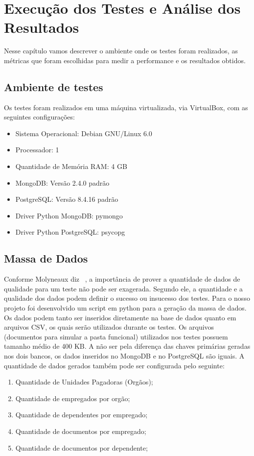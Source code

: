 \chapter {Execução dos Testes e Análise dos Resultados}

Nesse capítulo vamos descrever o ambiente onde os testes foram realizados, as métricas que foram escolhidas para medir a performance e os resultados obtidos.

\section{Ambiente de testes}

Os testes foram realizados em uma máquina virtualizada, via VirtualBox, com as seguintes configurações:

\begin{itemize}
\item Sistema Operacional: Debian GNU/Linux 6.0
\item Processador: 1 
\item Quantidade de Memória RAM: 4 GB
\item MongoDB: Versão 2.4.0 padrão
\item PostgreSQL: Versão 8.4.16 padrão
\item Driver Python MongoDB: pymongo
\item Driver Python PostgreSQL: psycopg
\end{itemize}

\section{Massa de Dados}

Conforme Molyneaux diz ~\cite{theartoftestperf}, a importância de prover a quantidade de dados de qualidade para um teste não pode ser exagerada. Segundo ele, a quantidade e a qualidade dos dados podem definir o sucesso ou insucesso dos testes. Para o nosso projeto foi desenvolvido um script em python para a geração da massa de dados. Os dados podem tanto ser inseridos diretamente na base de dados quanto em arquivos CSV, os quais serão utilizados durante os testes. Os arquivos (documentos para simular a pasta funcional) utilizados nos testes possuem tamanho médio de 400 KB. A não ser pela diferença das chaves primárias geradas nos dois bancos, os dados inseridos no MongoDB e no PostgreSQL são iguais. A quantidade de dados gerados também pode ser configurada pelo seguinte:

\begin{enumerate}
	\item Quantidade de Unidades Pagadoras (Orgãos);
	\item Quantidade de empregados por orgão;
	\item Quantidade de dependentes por empregado;
	\item Quantidade de documentos por empregado;
	\item Quantidade de documentos por dependente;
\end{enumerate}

